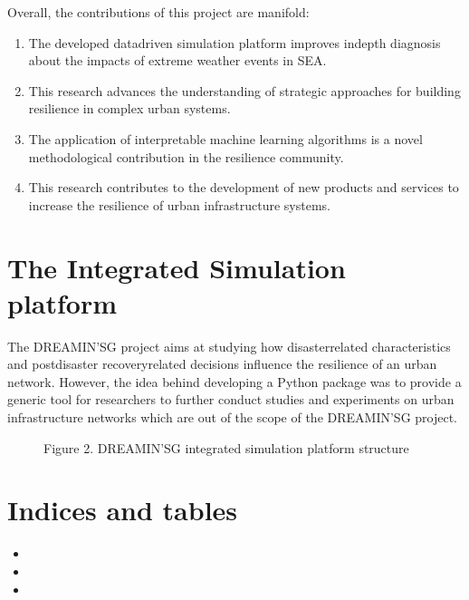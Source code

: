 \documentclass[letterpaper,10pt,english]{sphinxmanual}
\begin{document}
\sphinxAtStartPar
Overall, the contributions of this project are manifold:
\begin{enumerate}
%
\item {} 
\sphinxAtStartPar
The developed data\sphinxhyphen{}driven simulation platform improves in\sphinxhyphen{}depth diagnosis about the impacts of extreme weather events in SEA.

\item {} 
\sphinxAtStartPar
This research advances the understanding of strategic approaches for building resilience in complex urban systems.

\item {} 
\sphinxAtStartPar
The application of interpretable machine learning algorithms is a novel methodological contribution in the resilience community.

\item {} 
\sphinxAtStartPar
This research contributes to the development of new products and services to increase the resilience of urban infrastructure systems.

\end{enumerate}


\chapter{The Integrated Simulation platform}
\label{\detokenize{index:the-integrated-simulation-platform}}
\sphinxAtStartPar
The DREAMIN’SG project aims at studying how disaster\sphinxhyphen{}related characteristics and post\sphinxhyphen{}disaster recovery\sphinxhyphen{}related decisions influence
the resilience of an urban network. However, the idea behind developing a Python package was to provide a generic tool for researchers to further
conduct studies and experiments on urban infrastructure networks which are out of the scope of the DREAMIN'SG project.

\begin{figure}[htbp]
\centering
\capstart

\noindent{}
\caption{Figure 2. DREAMIN'SG integrated simulation platform structure}\label{\detokenize{index:id2}}\end{figure}


\chapter{Indices and tables}
\label{\detokenize{index:indices-and-tables}}\begin{itemize}
\item {} 
\sphinxAtStartPar
{}

\item {} 
\sphinxAtStartPar
{}

\item {} 
\sphinxAtStartPar
{}

\end{itemize}



\renewcommand{\indexname}{Index}
\printindex
\end{document}
